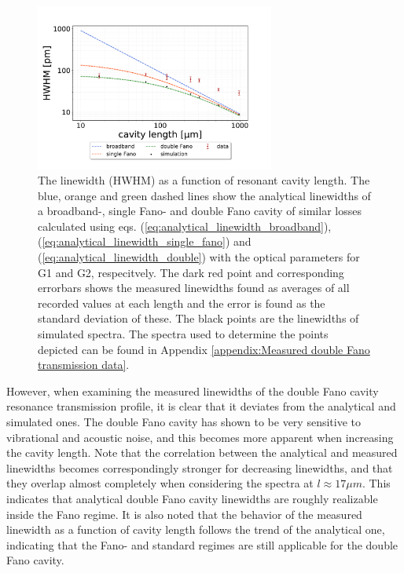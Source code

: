 \begin{figure}[h!]
    \centering
    \includegraphics[width=0.7\textwidth]{figures/results/double fano fits/HWHM_vs_cavity_length_result.pdf}
    \caption{The linewidth (HWHM) as a function of resonant cavity length. The blue, orange and green dashed lines show the analytical linewidths of a broadband-, single Fano- and double Fano cavity of similar losses calculated using eqs. (\ref{eq:analytical_linewidth_broadband}), (\ref{eq:analytical_linewidth_single_fano}) and (\ref{eq:analytical_linewidth_double}) with the optical parameters for G1 and G2, respecitvely. The dark red point and corresponding errorbars shows the measured linewidths found as averages of all recorded values at each length and the error is found as the standard deviation of these. The black points are the linewidths of simulated spectra. The spectra used to determine the points depicted can be found in Appendix \ref{appendix:Measured double Fano transmission data}.}
    \label{fig:HWHM_vs_l_double_fano_result}
\end{figure}

However, when examining the measured linewidths of the double Fano cavity resonance transmission profile, it is clear that it deviates from the analytical and simulated ones. The double Fano cavity has shown to be very sensitive to vibrational and acoustic noise, and this becomes more apparent when increasing the cavity length. Note that the correlation between the analytical and measured linewidths becomes correspondingly stronger for decreasing linewidths, and that they overlap almost completely when considering the spectra at $l \approx 17 \mu m$. This indicates that analytical double Fano cavity linewidths are roughly realizable inside the Fano regime. It is also noted that the behavior of the measured linewidth as a function of cavity length follows the trend of the analytical one, indicating that the Fano- and standard regimes are still applicable for the double Fano cavity. 

